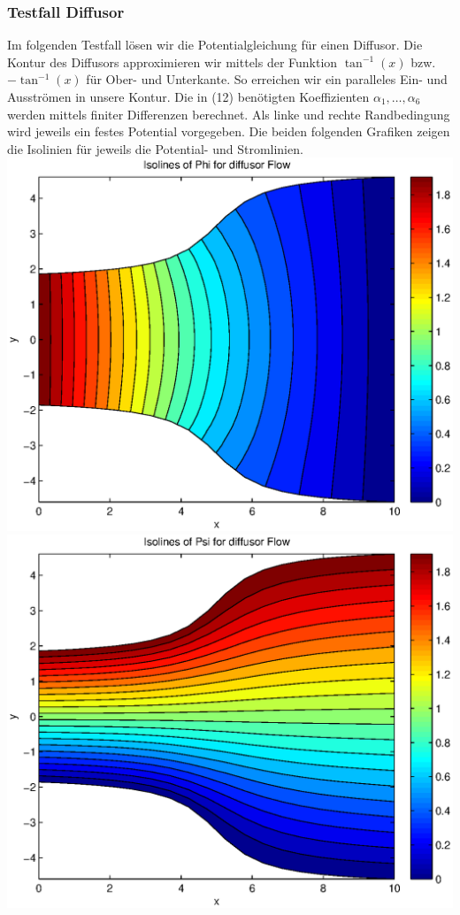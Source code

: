\documentclass{article}
\begin{document}
\subsubsection{Testfall Diffusor}
Im folgenden Testfall lösen wir die Potentialgleichung für einen Diffusor. Die Kontur des Diffusors approximieren
wir mittels der Funktion $\tan^{-1}(x)$ bzw. $-\tan^{-1}(x)$ für Ober- und Unterkante. So erreichen wir ein paralleles 
Ein- und Ausströmen in unsere Kontur. Die in (12) benötigten Koeffizienten $\alpha_1,\ldots,\alpha_6$ werden mittels finiter
Differenzen berechnet. Als linke und rechte Randbedingung wird jeweils ein festes Potential vorgegeben.
Die beiden folgenden Grafiken zeigen die Isolinien für jeweils die Potential- und Stromlinien.\\
\includegraphics[scale=0.4]{test/3diffusor/phi.eps}
\includegraphics[scale=0.4]{test/3diffusor/psi.eps}\\
\end{document}
